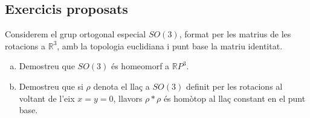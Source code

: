 \documentclass[../main.tex]{subfiles}
\begin{document}
\subsection{Exercicis proposats}
\begin{exercici}
[Exercici 4]\label{exercici2.4} Considerem el grup ortogonal especial $SO(3)$, format per les matrius de les rotacions a $\mathbb{R}^3$, amb la topologia euclidiana i punt base la matriu identitat.
\begin{enumerate}[(a)]
    \item Demostreu que $SO(3)$ és homeomorf a $\mathbb{R}P^3$.
    \item Demostreu que si $\rho$ denota el llaç a $SO(3)$ definit per les rotacions al voltant de l'eix $x = y = 0$, llavors $\rho*\rho$ és homòtop al llaç constant en el punt base.
\end{enumerate}
\end{exercici}
\end{document}
